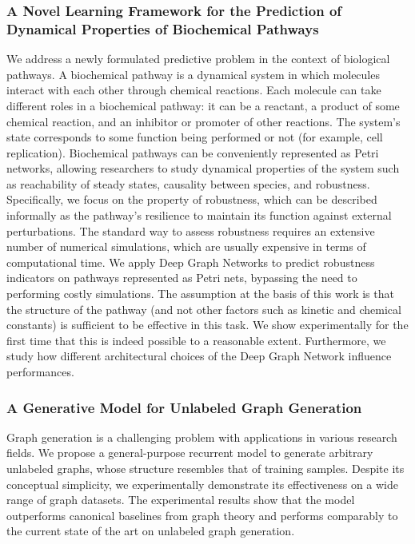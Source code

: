 \subsubsection*{A Novel Learning Framework for the Prediction of Dynamical Properties of Biochemical Pathways}
We address a newly formulated predictive problem in the context of biological pathways. A biochemical pathway is a dynamical system in which molecules interact with each other through chemical reactions. Each molecule can take different roles in a biochemical pathway: it can be a reactant, a product of some chemical reaction, and an inhibitor or promoter of other reactions. The system's state corresponds to some function being performed or not (for example, cell replication). Biochemical pathways can be conveniently represented as Petri networks, allowing researchers to study dynamical properties of the system such as reachability of steady states, causality between species, and robustness. Specifically, we focus on the property of robustness, which can be described informally as the pathway's resilience to maintain its function against external perturbations. The standard way to assess robustness requires an extensive number of numerical simulations, which are usually expensive in terms of computational time. We apply Deep Graph Networks to predict robustness indicators on pathways represented as Petri nets, bypassing the need to performing costly simulations. The assumption at the basis of this work is that the structure of the pathway (and not other factors such as kinetic and chemical constants) is sufficient to be effective in this task. We show experimentally for the first time that this is indeed possible to a reasonable extent. Furthermore, we study how different architectural choices of the Deep Graph Network influence performances.

\subsubsection*{A Generative Model for Unlabeled Graph Generation}
Graph generation is a challenging problem with applications in various research fields. We propose a general-purpose recurrent model to generate arbitrary unlabeled graphs, whose structure resembles that of training samples. Despite its conceptual simplicity, we experimentally demonstrate its effectiveness on a wide range of graph datasets. The experimental results show that the model outperforms canonical baselines from graph theory and performs comparably to the current state of the art on unlabeled graph generation.

